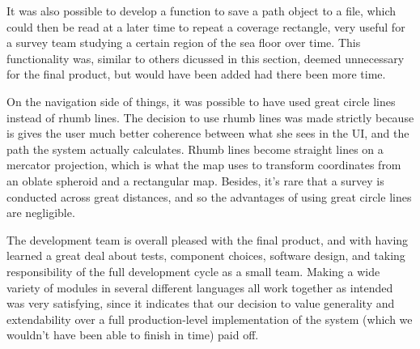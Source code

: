 It was also possible to develop a function to save a path object to a file, which could then be read at a later time to repeat a coverage rectangle, very useful for a survey team studying a certain region of the sea floor over time. This functionality was, similar to others dicussed in this section, deemed unnecessary for the final product, but would have been added had there been more time.

On the navigation side of things, it was possible to have used great circle lines instead of rhumb lines. The decision to use rhumb lines was made strictly because is gives the user much better coherence between what she sees in the UI, and the path the system actually calculates. Rhumb lines become straight lines on a mercator projection, which is what the map uses to transform coordinates from an oblate spheroid and a rectangular map. Besides, it's rare that a survey is conducted across great distances, and so the advantages of using great circle lines are negligible.

The development team is overall pleased with the final product, and with having learned a great deal about tests, component choices, software design, and taking responsibility of the full development cycle as a small team. Making a wide variety of modules in several different languages all work together as intended was very satisfying, since it indicates that our decision to value generality and extendability over a full production-level implementation of the system (which we wouldn't have been able to finish in time) paid off.